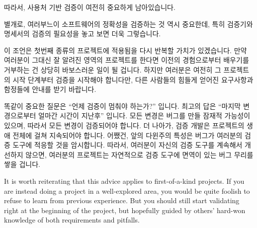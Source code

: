 {	따라서, 사용처 기반 검증이 여전히 중요하게 남아있습니다.

	별개로, 여러부느이 소프트웨어의 정확성을 검증하는 것 역시 중요한데,
	특히 검증기와 명세서의 검증의 필요성을 놓고 보면 더욱 그렇습니다.

}\QuickQuizEnd

이 조언은 첫번째 종류의 프로젝트에 적용됨을 다시 반복할 가치가 있겠습니다.
만약 여러분이 그대신 잘 알려진 영역의 프로젝트를 한다면 이전의 경험으로부터
배우기를 거부하는 건 상당히 바보스러운 일이 될 겁니다.
하지만 여러분은 여전히 그 프로젝트의 시작 단계부터 검증을 시작해야 합니다만,
다른 사람들의 힘들게 얻어진 요구사항과 함정들에 안내를 받기 바랍니다.

똑같이 중요한 질문은 ``언제 검증이 멈춰야 하는가?'' 입니다.
최고의 답은 ``마지막 변경으로부터 얼마간 시간이 지난후'' 입니다.
모든 변경은 버그를 만들 잠재적 가능성이 있으며, 따라서 모든 변경이 검증되어야
합니다.
더 나아가, 검증 개발은 프로젝트의 생애 전체에 걸쳐 지속되어야 합니다.
어쨌건, 앞의 다윈주의 특성은 버그가 여러분의 검증 도구에 적응할 것을
암시합니다.
따라서, 여러분이 자신의 검증 도구를 계속해서 개선하지 않으면, 여러분의
프로젝트는 자연적으로 검증 도구에 면역이 있는 버그 무리를 쌓을 겁니다.

\iffalse

It is worth reiterating that this advice applies to first-of-a-kind
projects.
If you are instead doing a project in a well-explored area, you would
be quite foolish to refuse to learn from previous experience.
But you should still start validating right at the beginning of the
project, but hopefully guided by others' hard-won knowledge of both
requirements and pitfalls.

